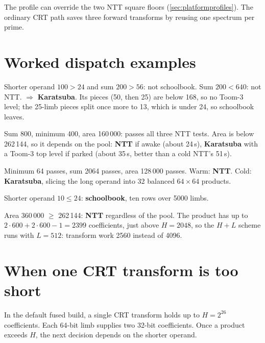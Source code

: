 The profile can override the two NTT square floors
(\cref{sec:platformprofiles}). The ordinary CRT path saves three forward
transforms by reusing one spectrum per prime.

\section{Worked dispatch examples}
\label{sec:mulexamples}

\begin{example}
\begin{description}[leftmargin=1.2cm,style=nextline]
  \item[A: $100 \times 100$] Shorter operand $100 > 24$ and sum $200 > 56$: not schoolbook.
        Sum $200 < 640$: not NTT. $\Rightarrow$ \textbf{Karatsuba}. Its pieces (50, then 25)
        are below 168, so no Toom-3 level; the 25-limb pieces split once more to 13, which is
        under 24, so schoolbook leaves.
  \item[B: $400 \times 400$] Sum 800, minimum 400, area 160\,000: passes all three NTT tests.
        Area is below 262\,144, so it depends on the pool: \textbf{NTT} if awake (about
        24\,\textmu s), \textbf{Karatsuba} with a Toom-3 top level if parked (about 35\,\textmu s,
        better than a cold NTT's 51\,\textmu s).
  \item[C: $64 \times 2000$] Minimum 64 passes, sum 2064 passes, area 128\,000 passes.
        Warm: \textbf{NTT}. Cold: \textbf{Karatsuba}, slicing the long operand into 32 balanced
        $64 \times 64$ products.
  \item[D: $10 \times 5000$] Shorter operand $10 \le 24$: \textbf{schoolbook}, ten
         rows over 5000 limbs.
  \item[E: $600 \times 600$] Area 360\,000 $\ge$ 262\,144: \textbf{NTT} regardless of the pool.
        The product has up to $2\cdot 600 + 2\cdot 600 - 1 = 2399$ coefficients,
        just above $H = 2048$, so the
        $H + L$ scheme runs with $L = 512$: transform work 2560 instead of 4096.
\end{description}
\end{example}

\newpage
\section{When one CRT transform is too short}
\label{sec:hugeproductdispatch}

In the default fused build, a single CRT transform holds up to
$H=2^{26}$ coefficients. Each 64-bit limb supplies two 32-bit
coefficients. Once a product exceeds $H$, the next decision depends on
the shorter operand.

